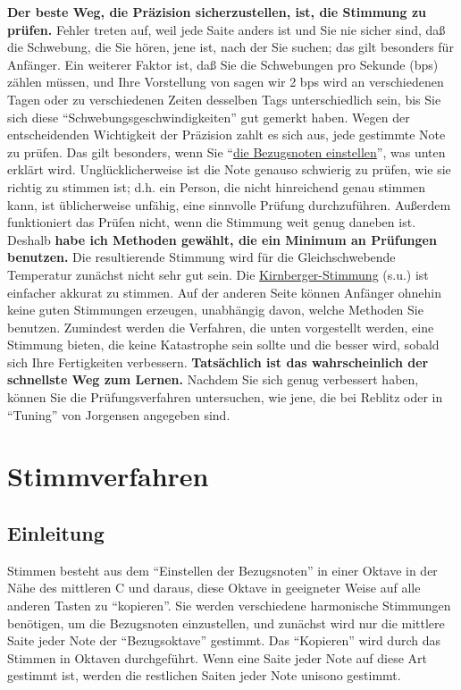 \textbf{Der beste Weg, die Präzision sicherzustellen, ist, die Stimmung zu prüfen.}
 Fehler treten auf, weil jede Saite anders ist und Sie nie sicher sind, daß die Schwebung, die Sie hören, jene ist, nach der Sie suchen; das gilt besonders für Anfänger.
 Ein weiterer Faktor ist, daß Sie die Schwebungen pro Sekunde (bps) zählen müssen, und Ihre Vorstellung von sagen wir 2 bps wird an verschiedenen Tagen oder zu verschiedenen Zeiten desselben Tags unterschiedlich sein, bis Sie sich diese \enquote{Schwebungsgeschwindigkeiten} gut gemerkt haben.
 Wegen der entscheidenden Wichtigkeit der Präzision zahlt es sich aus, jede gestimmte Note zu prüfen.
 Das gilt besonders, wenn Sie \enquote{\hyperlink{c2_6}{die Bezugsnoten einstellen}}, was unten erklärt wird.
 Unglücklicherweise ist die Note genauso schwierig zu prüfen, wie sie richtig zu stimmen ist; d.h. ein Person, die nicht hinreichend genau stimmen kann, ist üblicherweise unfähig, eine sinnvolle Prüfung durchzuführen.
 Außerdem funktioniert das Prüfen nicht, wenn die Stimmung weit genug daneben ist.
 Deshalb \textbf{habe ich Methoden gewählt, die ein Minimum an Prüfungen benutzen.}
 Die resultierende Stimmung wird für die Gleichschwebende Temperatur zunächst nicht sehr gut sein.
 Die \hyperlink{c2_6_kirn}{Kirnberger-Stimmung} (s.u.) ist einfacher akkurat zu stimmen.
 Auf der anderen Seite können Anfänger ohnehin keine guten Stimmungen erzeugen, unabhängig davon, welche Methoden Sie benutzen.
 Zumindest werden die Verfahren, die unten vorgestellt werden, eine Stimmung bieten, die keine Katastrophe sein sollte und die besser wird, sobald sich Ihre Fertigkeiten verbessern.
 \textbf{Tatsächlich ist das wahrscheinlich der schnellste Weg zum Lernen.}
 Nachdem Sie sich genug verbessert haben, können Sie die Prüfungsverfahren untersuchen, wie jene, die bei Reblitz oder in \enquote{Tuning} von Jorgensen angegeben sind.
 
\hypertarget{c2_6}{}

\section{Stimmverfahren}\hypertarget{c2_6a}{}

\subsection{Einleitung}

Stimmen besteht aus dem \enquote{Einstellen der Bezugsnoten} in einer Oktave in der Nähe des mittleren C und daraus, diese Oktave in geeigneter Weise auf alle anderen Tasten zu \enquote{kopieren}.
 Sie werden verschiedene harmonische Stimmungen benötigen, um die Bezugsnoten einzustellen, und zunächst wird nur die mittlere Saite jeder Note der \enquote{Bezugsoktave} gestimmt.
 Das \enquote{Kopieren} wird durch das Stimmen in Oktaven durchgeführt.
 Wenn eine Saite jeder Note auf diese Art gestimmt ist, werden die restlichen Saiten jeder Note unisono gestimmt.
 

